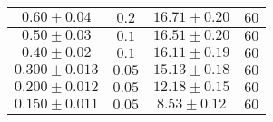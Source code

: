 \documentclass[../main.tex]{subfiles}
\begin{document}
\begin{tabular}{ ||c|c|c|c|| }
        \hline
        $0.60\pm 0.04$      & $0.2$       & $16.71\pm 0.20$  & $60$     \\
        \hline
        $0.50\pm 0.03$      & $0.1$       & $16.51\pm 0.20$  & $60$     \\
        \hline
        $0.40\pm 0.02$      & $0.1$       & $16.11\pm 0.19$   & $60$     \\
        \hline
        $0.300\pm 0.013$      & $0.05$       & $15.13\pm 0.18$   & $60$     \\
        \hline
        $0.200\pm 0.012$      & $0.05$       & $12.18\pm 0.15$   & $60$     \\
        \hline
        $0.150\pm 0.011$     & $0.05$       & $8.53\pm 0.12$   & $60$     \\
        \hline

    \end{tabular}
\end{document}
